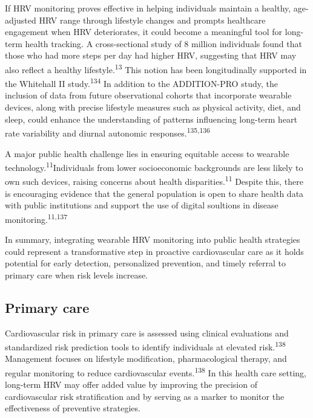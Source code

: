 \documentclass[
  a4paper,
  headsepline=true,
  open=left]{scrbook}
\begin{document}
If HRV monitoring proves effective in helping individuals maintain a
healthy, age-adjusted HRV range through lifestyle changes and prompts
healthcare engagement when HRV deteriorates, it could become a
meaningful tool for long-term health tracking. A cross-sectional study
of 8 million individuals found that those who had more steps per day had
higher HRV, suggesting that HRV may also reflect a healthy
lifestyle.\textsuperscript{13} This notion has been longitudinally
supported in the Whitehall II study.\textsuperscript{134} In addition to
the ADDITION-PRO study, the inclusion of data from future observational
cohorts that incorporate wearable devices, along with precise lifestyle
measures such as physical activity, diet, and sleep, could enhance the
understanding of patterns influencing long-term heart rate variability
and diurnal autonomic responses.\textsuperscript{135,136}

A major public health challenge lies in ensuring equitable access to
wearable technology.\textsuperscript{11}Individuals from lower
socioeconomic backgrounds are less likely to own such devices, raising
concerns about health disparities.\textsuperscript{11} Despite this,
there is encouraging evidence that the general population is open to
share health data with public institutions and support the use of
digital soultions in disease monitoring.\textsuperscript{11,137}

In summary, integrating wearable HRV monitoring into public health
strategies could represent a transformative step in proactive
cardiovascular care as it holds potential for early detection,
personalized prevention, and timely referral to primary care when risk
levels increase.

\hypertarget{primary-care}{%
\subsection{Primary care}\label{primary-care}}

Cardiovascular risk in primary care is assessed using clinical
evaluations and standardized risk prediction tools to identify
individuals at elevated risk.\textsuperscript{138} Management focuses on
lifestyle modification, pharmacological therapy, and regular monitoring
to reduce cardiovascular events.\textsuperscript{138} In this health
care setting, long-term HRV may offer added value by improving the
precision of cardiovascular risk stratification and by serving as a
marker to monitor the effectiveness of preventive strategies.
\end{document}
